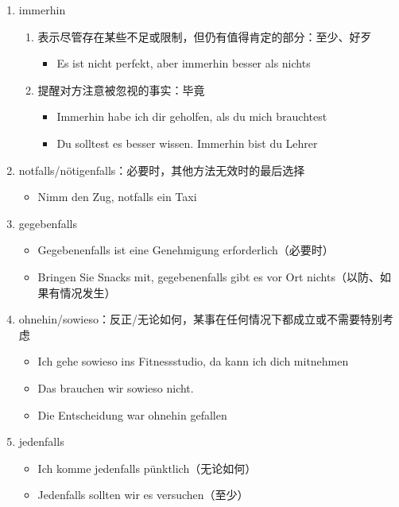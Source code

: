 \documentclass[UTF8]{report}
\begin{document}
\begin{enumerate}
    \item immerhin
    \begin{enumerate}
        \item 表示尽管存在某些不足或限制，但仍有值得肯定的部分：至少、好歹
        \begin{itemize}
            \item Es ist nicht perfekt, aber immerhin besser als nichts
        \end{itemize}
        \item 提醒对方注意被忽视的事实：毕竟
        \begin{itemize}
            \item Immerhin habe ich dir geholfen, als du mich brauchtest
            \item Du solltest es besser wissen. Immerhin bist du Lehrer
        \end{itemize}
    \end{enumerate}
    \item notfalls/nötigenfalls：必要时，其他方法无效时的最后选择
    \begin{itemize}
        \item Nimm den Zug, notfalls ein Taxi
    \end{itemize}
    \item gegebenfalls
    \begin{itemize}
        \item Gegebenenfalls ist eine Genehmigung erforderlich（必要时）
        \item Bringen Sie Snacks mit, gegebenenfalls gibt es vor Ort nichts（以防、如果有情况发生）
    \end{itemize}
    \item ohnehin/sowieso：反正/无论如何，某事在任何情况下都成立或不需要特别考虑
    \begin{itemize}
        \item Ich gehe sowieso ins Fitnessstudio, da kann ich dich mitnehmen
        \item Das brauchen wir sowieso nicht.
        \item Die Entscheidung war ohnehin gefallen
    \end{itemize}
    \item jedenfalls
    \begin{itemize}
        \item Ich komme jedenfalls pünktlich（无论如何）
        \item Jedenfalls sollten wir es versuchen（至少）
    \end{itemize}
\end{enumerate}
\end{document}
